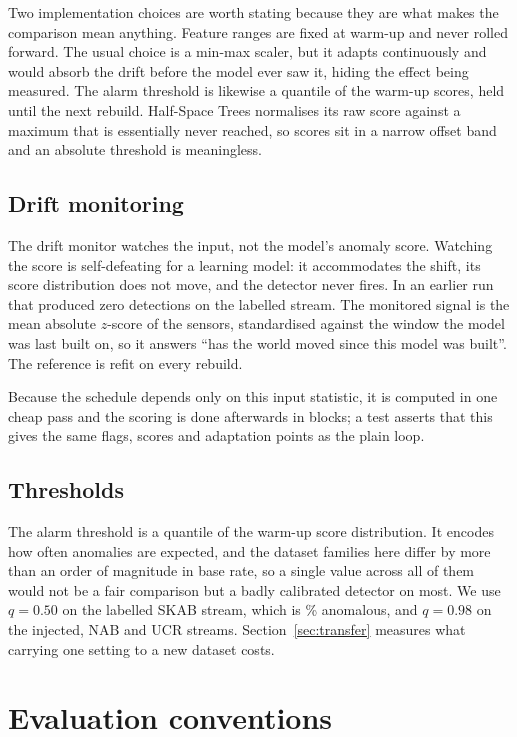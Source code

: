 \documentclass[11pt,a4paper]{article}
\begin{document}
Two implementation choices are worth stating because they are what makes the
comparison mean anything. Feature ranges are fixed at warm-up and never
rolled forward. The usual choice is a min-max scaler, but it adapts continuously and
would absorb the drift before the model ever saw it, hiding the effect being
measured. The alarm threshold is likewise a quantile of the warm-up scores, held
until the next rebuild. Half-Space Trees normalises its raw score against a
maximum that is essentially never reached, so scores sit in a narrow offset band
and an absolute threshold is meaningless.

\subsection{Drift monitoring}
\label{sec:monitoring}

The drift monitor watches the input, not the model's anomaly score. Watching the
score is self-defeating for a learning model: it accommodates the shift, its
score distribution does not move, and the detector never fires. In an earlier
run that produced zero detections on the labelled stream. The monitored signal
is the mean absolute $z$-score of the sensors, standardised against the window
the model was last built on, so it answers ``has the world moved since this
model was built''. The reference is refit on every rebuild.

Because the schedule depends only on this input statistic, it is computed in one
cheap pass and the scoring is done afterwards in blocks; a test asserts that this
gives the same flags, scores and adaptation points as the plain loop.

\subsection{Thresholds}

The alarm threshold is a quantile of the warm-up score distribution. It encodes
how often anomalies are expected, and the dataset families here differ by more
than an order of magnitude in base rate, so a single value across all of them
would not be a fair comparison but a badly calibrated detector on most. We use
$q=0.50$ on the labelled SKAB stream, which is \BaseRate\% anomalous, and
$q=0.98$ on the injected, NAB and UCR streams. Section~\ref{sec:transfer} measures
what carrying one setting to a new dataset costs.

\section{Evaluation conventions}
\end{document}

